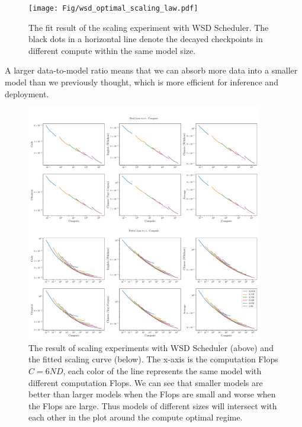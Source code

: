 \begin{figure}[!t]
    \centering
    \texttt{[image: Fig/wsd\_optimal\_scaling\_law.pdf]}
    \caption{The fit result of the scaling experiment with WSD Scheduler. The black dots in a horizontal line denote the decayed checkpoints in different compute within the same model size.}
    \label{fig:wsd_optimalscalinglaw}
\end{figure}

A larger data-to-model ratio means that we can absorb more data into a smaller model than we previously thought, which is more efficient for inference and deployment.

\begin{figure}[!t]
    \centering
    \includegraphics[width=0.92\textwidth]{Fig/lossvscompute_fitted_and_real.pdf}
    \caption{The result of scaling experiments with WSD Scheduler (above) and the fitted scaling curve (below). The x-axis is the computation Flops $C =6ND$, each color of the line represents the same model with different computation Flops. We can see that smaller models are better than larger models when the Flops are small and worse when the Flops are large. Thus models of different sizes will intersect with each other in the plot around the compute optimal regime.}
    \label{fig:wsd_optimalscalinglaw}
\end{figure}
